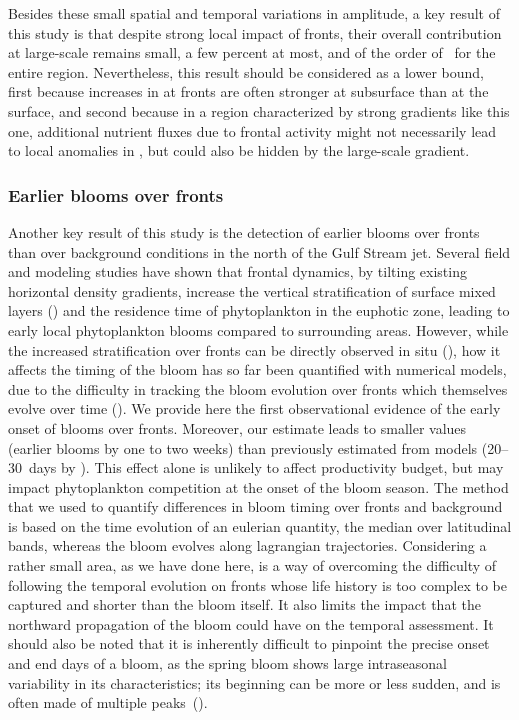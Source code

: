 Besides these small spatial and temporal variations in amplitude, a key result of this study is that despite strong local impact of fronts, their overall contribution at large-scale remains small, a few percent at most, and of the order of~ for the entire region.
Nevertheless, this result should be considered as a lower bound, first because increases in  at fronts are often stronger at subsurface than at the surface, and second because in a region characterized by strong gradients like this one, additional nutrient fluxes due to frontal activity might not necessarily lead to local anomalies in , but could also be hidden by the large-scale gradient.


\subsubsection{Earlier blooms over fronts}

Another key result of this study is the detection of earlier blooms over fronts than over background conditions in the north of the Gulf Stream jet.
Several field and modeling studies have shown that frontal dynamics, by tilting existing horizontal density gradients, increase the vertical stratification of surface mixed layers (\cite{taylor_2011}) and the residence time of phytoplankton in the euphotic zone, leading to early local phytoplankton blooms compared to surrounding areas.
However, while the increased stratification over fronts can be directly observed in situ (\cite{karleskind_2011, mahadevan_2012}), how it affects the timing of the bloom has so far been quantified with numerical models, due to the difficulty in tracking the bloom evolution over fronts which themselves evolve over time (\cite{levy_2000, karleskind_2011, mahadevan_2012}).
We provide here the first observational evidence of the early onset of blooms over fronts.
Moreover, our estimate leads to smaller values (earlier blooms by one to two weeks) than previously estimated from models (20--30~days by \textcite{mahadevan_2012}).
This effect alone is unlikely to affect productivity budget, but may impact phytoplankton competition at the onset of the bloom season.
The method that we used to quantify differences in bloom timing over fronts and background is based on the time evolution of an eulerian quantity, the  median over latitudinal bands, whereas the bloom evolves along lagrangian trajectories.
Considering a rather small area, as we have done here, is a way of overcoming the difficulty of following the temporal evolution on fronts whose life history is too complex to be captured and shorter than the bloom itself.
It also limits the impact that the northward propagation of the bloom could have on the temporal assessment.
It should also be noted that it is inherently difficult to pinpoint the precise onset and end days of a bloom, as the spring bloom shows large intraseasonal variability in its characteristics; its beginning can be more or less sudden, and is often made of multiple peaks~(\cite{keerthi_2020}).


